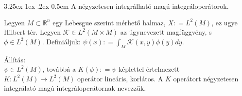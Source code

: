 \documentclass[12pt,a4paper]{scrartcl}
\makeatletter
\renewcommand\paragraph{\@startsection{paragraph}{4}{\z@}%
                                    {3.25ex \@plus1ex \@minus.2ex}%
                                    {0.5em} %
                                    {\normalfont\normalsize\bfseries}}
\newenvironment{allitas}{}{}
\makeatother
\begin{document}
\hypertarget{a-negyzetesen-integralhato-magu-integraloperatorok.}{%
\paragraph{A négyzetesen integrálható magú
integráloperátorok.}\label{a-negyzetesen-integralhato-magu-integraloperatorok.}}

Legyen \(M \subset {\mathbb{R}}^{n}\) egy Lebesgue szerint mérhető
halmaz, \(X: = L^{2}\left( M \right)\), ez ugye Hilbert tér. Legyen
\(\mathcal{K} \in L^{2}\left( {M \times M} \right)\) az úgynevezett
magfüggvény, s \(\phi \in L^{2}\left( M \right)\). Definiáljuk:
\(\psi\left( x \right): = {\int_{M}{\mathcal{K}\left( {x,y} \right)\phi\left( y \right)dy}}\).

\begin{allitas}

Állítás:\\
\(\psi \in L^{2}\left( M \right)\), továbbá a
\(K\left( \phi \right): = \psi\) képlettel értelmezett
\(\left. K:L^{2}\left( M \right)\rightarrow L^{2}\left( M \right) \right.\)
operátor lineáris, korlátos. A \(K\) operátort négyzetesen integrálató
magú integráloperátornak nevezzük.

\end{allitas}
\end{document}
